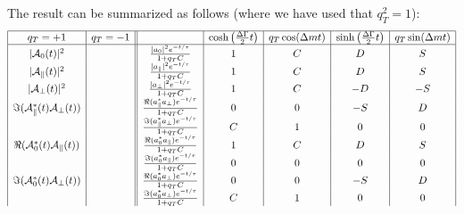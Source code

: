\documentclass[a4paper,10pt,twosided]{article}
\begin{document}
The result can be summarized as follows (where we have used that $q_T^2=1$):
\begin{equation}
\begin{array}{| c |c|| c | c | c | c | c |}
 \hline
                        q_T=+1                      &    q_T = -1&                          &  \cosh\left(\frac{\Delta\Gamma}{2}t\right) & q_T \cos(\Delta m t)  & \sinh\left(\frac{\Delta\Gamma}{2}t\right) &q_T\sin(\Delta m t)  \\
 \hline
|{\cal A}_0(t)|^2                             &                                                                &\frac{  | a_0 |^2 e^{-t/\tau}}{1+q_TC}                  & 1 &   C  &   D &  S   \\
|{\cal A}_\parallel(t)|^2                     &                                                                &\frac{  | a_\parallel |^2 e^{-t/\tau}}{1+q_TC}          & 1 &   C  &   D &  S   \\
|{\cal A}_\perp(t)|^2                         &                                                                &\frac{  | a_\perp |^2 e^{-t/\tau}}{1+q_TC}              & 1 &   C  &  -D & -S   \\
\Im({\cal A}_\parallel^*(t){\cal A}_\perp(t)) &                                                                &\frac{  \Re(a_\parallel^* a_\perp)e^{-t/\tau}}{1+q_TC}  & 0 &   0  &  -S &  D   \\                         
                                              &                                                                &\frac{  \Im(a_\parallel^* a_\perp)e^{-t/\tau}}{1+q_TC}  & C &   1  &   0 &  0   \\
\Re({\cal A}_0^*(t){\cal A}_\parallel(t))     &                                                                &\frac{  \Re(a_0^*a_\parallel)e^{-t/\tau}}{1+q_TC}       & 1 &   C  &   D &  S   \\
                                              &                                                                &\frac{  \Im(a_0^*a_\parallel)e^{-t/\tau}}{1+q_TC}       & 0 &   0  &   0 &  0   \\
\Im({\cal A}_0^*(t){\cal A}_\perp(t))         &                                                                &\frac{  \Re(a_0^* a_\perp)e^{-t/\tau}}{1+q_TC}          & 0 &   0  &  -S &  D   \\
                                              &                                                                &\frac{  \Im(a_0^* a_\perp)e^{-t/\tau}}{1+q_TC}          & C &   1  &   0 &  0   \\

\end{array}
\end{equation}
\end{document}

